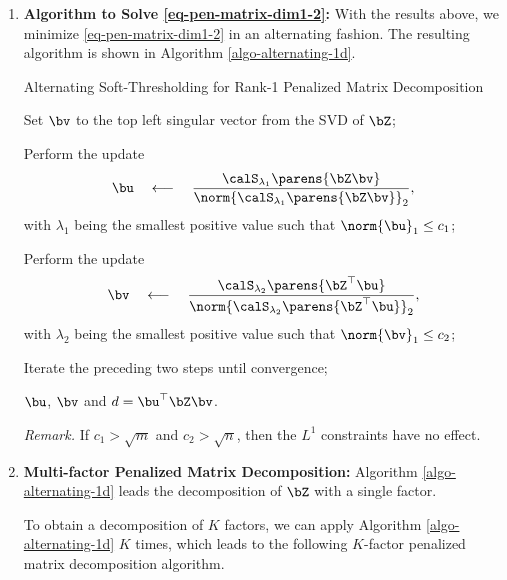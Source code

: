 \documentclass[12pt]{article}
\begin{document}
\begin{enumerate}[label=\textbf{\arabic*.}]
	\item \textbf{Algorithm to Solve \eqref{eq-pen-matrix-dim1-2}:} 
	With the results above, we minimize \eqref{eq-pen-matrix-dim1-2} in an alternating fashion. The resulting algorithm is shown in Algorithm \ref{algo-alternating-1d}. 
	
	\begin{minipage}{\linewidth}
		\begin{algorithm}[H]
		\caption{Alternating Soft-Thresholding for Rank-1 Penalized Matrix Decomposition}\label{algo-alternating-1d}
		\begin{algorithmic}[1]
			\STATE Set $\bv$ to the top left singular vector from the SVD of $\bZ$; 
			
			\STATE Perform the update 
			\begin{align*}
				\bu \quad \longleftarrow \quad \frac{\calS_{\lambda_1} \parens{\bZ \bv}}{\norm{\calS_{\lambda_1} \parens{\bZ \bv}}_2}, 
			\end{align*}
			with $\lambda_1$ being the smallest positive value such that $\norm{\bu}_1 \le c_1$; 
			
			\STATE Perform the update 
			\begin{align*}
				\bv \quad \longleftarrow \quad \frac{\calS_{\lambda_2} \parens{\bZ^\top \bu}}{\norm{\calS_{\lambda_2} \parens{\bZ^\top \bu}}_2}, 
			\end{align*}
			with $\lambda_2$ being the smallest positive value such that $\norm{\bv}_1 \le c_2$; 
			
			\STATE Iterate the preceding two steps until convergence; 
			
			\RETURN $\bu$, $\bv$ and $d = \bu^\top \bZ \bv$. 
		\end{algorithmic}
	\end{algorithm}
	\end{minipage}
	
	\vspace{5pt}
	
	\textit{Remark.} If $c_1 > \sqrt{m}$ and $c_2 > \sqrt{n}$, then the $L^1$ constraints have no effect. 
	
	\item \textbf{Multi-factor Penalized Matrix Decomposition:} Algorithm \ref{algo-alternating-1d} leads the decomposition of $\bZ$ with a single factor. 
	
	To obtain a decomposition of $K$ factors, we can apply Algorithm \ref{algo-alternating-1d} $K$ times, which leads to the following $K$-factor penalized matrix decomposition algorithm. 
	

\end{enumerate}
\end{document}
